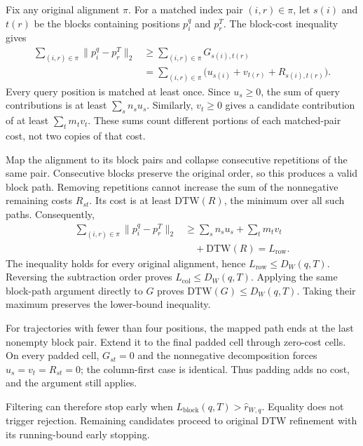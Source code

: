 \documentclass[10pt,conference,letterpaper]{IEEEtran}
\begin{document}
\begin{IEEEproof}
Fix any original alignment $\pi$. For a matched index pair $(i,r)\in\pi$,
let $s(i)$ and $t(r)$ be the blocks containing positions $p_i^q$ and $p_r^T$.
The block-cost inequality gives
\begin{equation}
\begin{aligned}
\sum_{(i,r)\in\pi}\lVert p_i^q-p_r^T\rVert_2
&\geq\sum_{(i,r)\in\pi}G_{s(i),t(r)}\\
&=\sum_{(i,r)\in\pi}
\bigl(u_{s(i)}+v_{t(r)}+R_{s(i),t(r)}\bigr).
\end{aligned}
\end{equation}
Every query position is matched at least once. Since $u_s\geq0$, the sum
of query contributions is at least $\sum_s n_su_s$. Similarly, $v_t\geq0$
gives a candidate contribution of at least $\sum_t m_tv_t$. These sums count
different portions of each matched-pair cost, not two copies of that cost.

Map the alignment to its block pairs and collapse consecutive repetitions
of the same pair. Consecutive blocks preserve the original order, so this
produces a valid block path. Removing repetitions cannot increase the sum
of the nonnegative remaining costs $R_{st}$. Its cost is at least
$\mathrm{DTW}(R)$, the minimum over all such paths. Consequently,
\begin{equation}
\begin{aligned}
\sum_{(i,r)\in\pi}\lVert p_i^q-p_r^T\rVert_2
&\geq\sum_s n_su_s+\sum_t m_tv_t\\
&\quad+\mathrm{DTW}(R)=L_{\mathrm{row}}.
\end{aligned}
\end{equation}
The inequality holds for every original alignment, hence
$L_{\mathrm{row}}\leq D_W(q,T)$. Reversing the subtraction order proves
$L_{\mathrm{col}}\leq D_W(q,T)$. Applying the same block-path argument
directly to $G$ proves $\mathrm{DTW}(G)\leq D_W(q,T)$. Taking their maximum
preserves the lower-bound inequality.

For trajectories with fewer than four positions, the mapped path ends at
the last nonempty block pair. Extend it to the final padded cell through
zero-cost cells. On every padded cell, $G_{st}=0$ and the nonnegative
decomposition forces $u_s=v_t=R_{st}=0$; the column-first case is identical.
Thus padding adds no cost, and the argument still applies.
\end{IEEEproof}

Filtering can therefore stop early when
$L_{\mathrm{block}}(q,T)>\widehat r_{W,q}$. Equality does not trigger
rejection. Remaining candidates proceed to original DTW refinement with
its running-bound early stopping.
\end{document}
